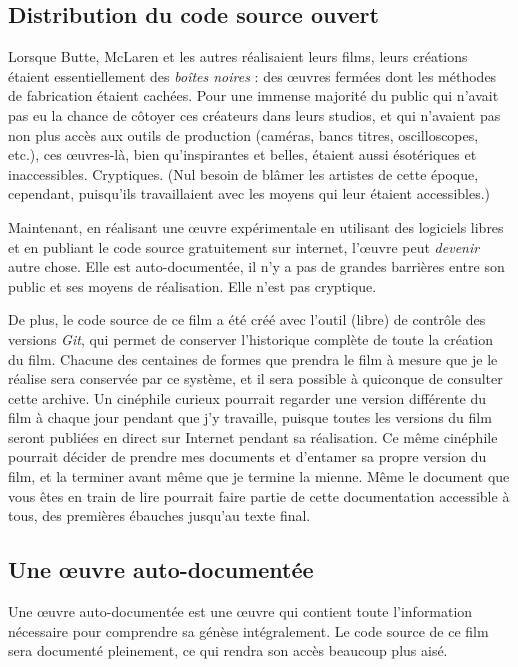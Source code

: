 \subsection{Distribution du code source ouvert}


Lorsque Butte, McLaren et les autres réalisaient leurs films, leurs créations étaient essentiellement des \textit{boîtes noires} : des \oe{}uvres fermées dont les méthodes de fabrication étaient cachées. Pour une immense majorité du public qui n'avait pas eu la chance de côtoyer ces créateurs dans leurs studios, et qui n'avaient pas non plus accès aux outils de production (caméras, bancs titres, oscilloscopes, etc.), ces \oe{}uvres-là, bien qu'inspirantes et belles, étaient aussi ésotériques et inaccessibles. Cryptiques. (Nul besoin de blâmer les artistes de cette époque, cependant, puisqu'ils travaillaient avec les moyens qui leur étaient accessibles.)

Maintenant, en réalisant une \oe{}uvre expérimentale en utilisant des logiciels libres et en publiant le code source gratuitement sur internet, l'\oe{}uvre peut \textit{devenir} autre chose. Elle est auto-documentée, il n'y a pas de grandes barrières entre son public et ses moyens de réalisation. Elle n'est pas cryptique.

De plus, le code source de ce film a été créé avec l'outil (libre) de contrôle des versions \textit{Git}, qui permet de conserver l'historique complète de toute la création du film. Chacune des centaines de formes que prendra le film à mesure que je le réalise sera conservée par ce système, et il sera possible à quiconque de consulter cette archive. Un cinéphile curieux pourrait regarder une version différente du film à chaque jour pendant que j'y travaille, puisque toutes les versions du film seront publiées en direct sur Internet pendant sa réalisation. Ce même cinéphile pourrait décider de prendre mes documents et d'entamer sa propre version du film, et la terminer avant même que je termine la mienne. Même le document que vous êtes en train de lire pourrait faire partie de cette documentation accessible à tous, des premières ébauches jusqu'au texte final.




\subsection{Une \oe{}uvre auto-documentée}
Une \oe{}uvre auto-documentée est une \oe{}uvre qui contient toute l'information nécessaire pour comprendre sa génèse intégralement. Le code source de ce film sera documenté pleinement, ce qui rendra son accès beaucoup plus aisé.

